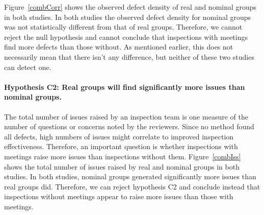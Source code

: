 Figure~\ref{combCorr} shows the observed defect density of real and nominal
groups in both studies.  In both studies the observed defect density
for nominal groups was not statistically different from that of real
groups. Therefore, we cannot reject the null hypothesis and cannot conclude
that inspections with meetings find more defects than those without. As 
mentioned earlier, this does not necessarily mean that there isn't any
difference, but neither of these two studies can detect one.




\paragraph{Hypothesis C2: Real groups will find significantly more issues than nominal groups.} 

The total number of issues raised by an inspection team is one measure of
the number of questions or concerns noted by the reviewers. Since no method 
found all defects, high numbers of issues might 
correlate to improved inspection effectiveness.  Therefore, an important
question is whether inspections with meetings raise more issues than
inspections without them.  Figure~\ref{combIss} shows the total number of
issues raised by real and nominal groups in both studies.  In both
studies, nominal groups generated significantly more issues than real groups did.
Therefore, we can reject hypothesis C2 and conclude instead that inspections
without meetings appear to raise more issues than those with meetings.



